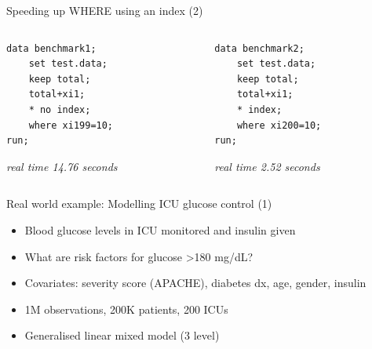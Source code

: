 \documentclass[aspectratio=169,12pt,usepdftitle=false]{beamer} %
\begin{document}
\begin{frame}[fragile]{Speeding up WHERE using an index (2)}
\begin{columns}
\begin{column}{0.5\textwidth}
\begin{verbatim}
data benchmark1;
    set test.data;
    keep total;
    total+xi1;
    * no index;
    where xi199=10;
run;
\end{verbatim}
\emph{real time 14.76 seconds}
\end{column}
\begin{column}{0.5\textwidth}
\begin{verbatim}
data benchmark2;
    set test.data;
    keep total;
    total+xi1;
    * index;
    where xi200=10;
run;
\end{verbatim}
\emph{real time 2.52 seconds}
\end{column}
\end{columns}
\end{frame}
{
\begin{frame}[plain]
\end{frame}
}

\begin{frame}{Real world example: Modelling ICU glucose control (1)}
    \begin{itemize}
	\item Blood glucose levels in ICU monitored and insulin given
	\item What are risk factors for glucose >180 mg/dL?
	\item Covariates: severity score (APACHE), diabetes dx, age, gender, insulin
	\item 1M observations, 200K patients, 200 ICUs
	\item Generalised linear mixed model (3 level)
    \end{itemize}
\end{frame}
\end{document}
